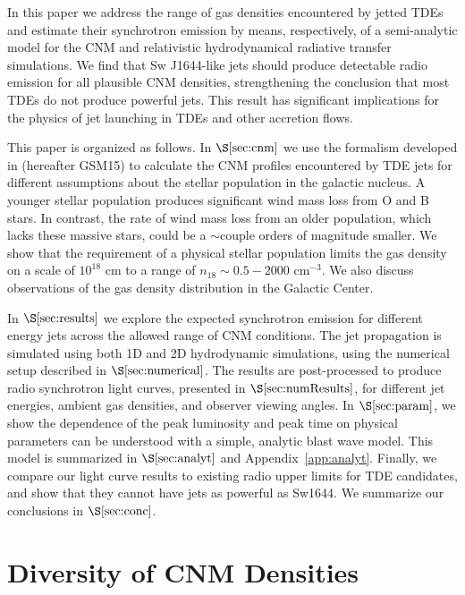\documentclass[usenatbib,fleqn]{mnras}
\begin{document}
In this paper we address the range of gas densities encountered by jetted TDEs and estimate their synchrotron emission by means, respectively, of a semi-analytic model for the CNM and relativistic hydrodynamical radiative transfer simulations.  We find that Sw J1644-like jets should produce detectable radio emission for all plausible CNM densities, strengthening the conclusion that most TDEs do not produce powerful jets.  This result has significant implications for the physics of jet launching in TDEs and other accretion flows.

This paper is organized as follows.  In $\S\ref{sec:cnm}$ we use the formalism developed in
\citet{Generozov+2015} (hereafter GSM15) to calculate the CNM profiles
encountered by TDE jets for different assumptions about the stellar
population in the galactic nucleus.  A younger stellar population
produces significant wind mass loss from O and B stars. In contrast,
the rate of wind mass loss from an older population, which lacks these
massive stars, could be a $\sim$couple orders of magnitude smaller.
We show that the requirement of a physical stellar population limits
the gas density on a scale of $10^{18}$ cm to a range of $n_{18} \sim
0.5-2000$ cm$^{-3}$. We also discuss observations of the gas density
distribution in the Galactic Center. 

In $\S\ref{sec:results}$ we explore the expected synchrotron emission for different energy jets
across the allowed range of CNM conditions.  The jet propagation is
simulated using both 1D and 2D hydrodynamic simulations, using the
numerical setup described in $\S\ref{sec:numerical}$. The results are
post-processed to produce radio synchrotron light curves, presented in
$\S\ref{sec:numResults}$, for different jet energies, ambient gas
densities, and observer viewing angles. In $\S\ref{sec:param}$, we
show the dependence of the peak luminosity and peak time on physical
parameters can be understood with a simple, analytic blast wave
model. This model is summarized in $\S\ref{sec:analyt}$ and
Appendix~\ref{app:analyt}. Finally, we compare our light curve results
to existing radio upper limits for TDE candidates, and show that they
cannot have jets as powerful as Sw1644. We summarize our conclusions
in $\S\ref{sec:conc}$.

\section{Diversity of CNM Densities}
\label{sec:cnm}

\end{document}
